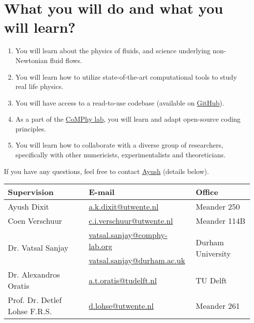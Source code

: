 \documentclass[a4paper,10pt]{article}
\begin{document}
\section*{What you will do and what you will learn?}

\begin{enumerate}
\item You will learn about the physics of fluids, and science underlying non-Newtonian fluid flows. 
\item You will learn how to utilize state-of-the-art computational tools to study real life physics. 
\item You will have access to a read-to-use codebase (available on \href{https://comphy-lab.org/MultiRheoFlow}{GitHub}).
\item As a part of the \href{https://comphy-lab.org}{CoMPhy lab}, you will learn and adapt open-source coding principles. 
\item You will learn how to collaborate with a diverse group of researchers, specifically with other numericists, experimentalists and theoreticians.

\end{enumerate}

If you have any questions, feel free to contact \href{mailto:a.k.dixit@utwente.nl}{Ayush} (details below).
\begin{center}
\begin{tabular}{|l|l|l|}
\hline \textbf{Supervision} & \textbf{E-mail} & \textbf{Office} \\
\hline Ayush Dixit & \href{mailto:a.k.dixit@utwente.nl}{a.k.dixit@utwente.nl} & Meander 250 \\
\hline Coen Verschuur & \href{mailto:c.i.verschuur@utwente.nl}{c.i.verschuur@utwente.nl} & Meander 114B \\
\hline \multirow{2}{*}{Dr. Vatsal Sanjay} & \href{mailto:vatsal.sanjay@comphy-lab.org}{vatsal.sanjay@comphy-lab.org} & \multirow{2}{*}{Durham University} \\
& \href{mailto:vatsal.sanjay@durham.ac.uk}{vatsal.sanjay@durham.ac.uk} & \\
\hline Dr. Alexandros Oratis   & \href{mailto:a.t.oratis@tudelft.nl}{a.t.oratis@tudelft.nl}& TU Delft \\
\hline Prof. Dr. Detlef Lohse F.R.S. & \href{mailto:d.lohse@utwente.nl}{d.lohse@utwente.nl} & Meander 261  \\
\hline
\end{tabular}
\end{center}
\printbibliography
\end{document}
